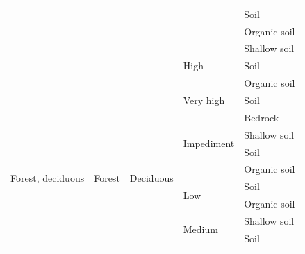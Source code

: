 \documentclass{article}
\begin{document}
\begin{longtable}{ p{4cm} | p{4cm} l l l}
                        &                           &                           &                                   &       Soil \\         \cline{5-5}
                        &                           &                           &                                   &       Organic soil \\ \cline{5-5}
\cline{4-5}
                        &                           &                           &       \multirow{3}{*}{High}       &       Shallow soil \\ \cline{5-5}
                        &                           &                           &                                   &       Soil \\         \cline{5-5}
                        &                           &                           &                                   &       Organic soil \\ \cline{5-5}
\cline{4-5}
                        &                           &                           &       Very high                   &       Soil          \\ \cline{5-5}
\hline
\multirow{11}{*}{Forest, deciduous} & \multirow{11}{*}{Forest} & \multirow{11}{*}{Deciduous} &  \multirow{4}{*}{Impediment} & Bedrock \\    \cline{5-5}
                        &                           &                           &                                   &       Shallow soil \\ \cline{5-5}
                        &                           &                           &                                   &       Soil \\         \cline{5-5}
                        &                           &                           &                                   &       Organic soil \\ \cline{5-5}
\cline{4-5}
                        &                           &                           &       \multirow{2}{*}{Low}        &       Soil \\         \cline{5-5}
                        &                           &                           &                                   &       Organic soil \\ \cline{5-5}
\cline{4-5}
                        &                           &                           &       \multirow{3}{*}{Medium}     &       Shallow soil \\ \cline{5-5}
                        &                           &                           &                                   &       Soil \\         \cline{5-5}

\end{longtable}
\end{document}

